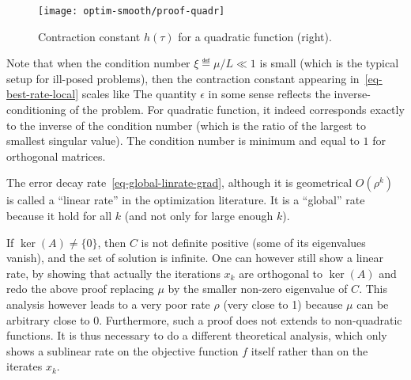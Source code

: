 \begin{figure}
\centering
\texttt{[image: optim-smooth/proof-quadr]}
\caption{\label{fig-grad-desc-contract}
Contraction constant $h(\tau)$ for a quadratic function (right). 
}
\end{figure}

Note that when the condition number $\xi \eqdef \mu/L \ll 1$
is small (which is the typical setup for ill-posed problems), then the contraction constant appearing in~\eqref{eq-best-rate-local} scales like 
%
The quantity $\epsilon$ in some sense reflects the inverse-conditioning of the problem. For quadratic function, it indeed corresponds exactly to the inverse of the condition number (which is the ratio of the largest to smallest singular value). The condition number is minimum and equal to $1$ for orthogonal matrices.

The error decay rate~\eqref{eq-global-linrate-grad}, although it is geometrical $O(\rho^k)$ is called a ``linear rate'' in the optimization literature. It is a ``global'' rate because it hold for all $k$ (and not only for large enough $k$).

If $\ker(A) \neq \{0\}$, then $C$ is not definite positive (some of its eigenvalues vanish), and the set of solution is infinite. 
%
One can however still show a linear rate, by showing that actually the iterations $x_k$ are orthogonal to $\ker(A)$ and redo the above proof replacing $\mu$ by the smaller non-zero eigenvalue of $C$. This analysis however leads to a very poor rate $\rho$ (very close to 1) because $\mu$ can be arbitrary close to 0. Furthermore, such a proof does not extends to non-quadratic functions. It is thus necessary to do a different theoretical analysis, which only shows a sublinear rate on the objective function $f$ itself rather than on the iterates $x_k$.  


